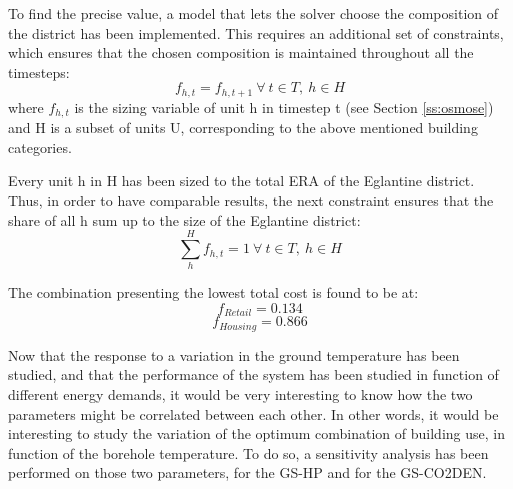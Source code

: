 \documentclass{article}
\begin{document}
To find the precise value, a model that lets the solver choose the composition of the district has been implemented. This requires an additional set of constraints, which ensures that the chosen composition is maintained throughout all the timesteps:
\begin{equation}
f_{h,t} = f_{h,t+1} \ \forall \ t \in T, \ h \in H
\end{equation}
where $f_{h,t}$ is the sizing variable of unit h in timestep t (see Section \ref{ss:osmose}) and H is a subset of units U, corresponding to the above mentioned building categories.

Every unit h in H has been sized to the total ERA of the Eglantine district. Thus, in order to have comparable results, the next constraint ensures that the share of all h sum up to the size of the Eglantine district:
\begin{equation}
\sum_{h}^{H} f_{h,t} = 1 \ \forall \ t \in T, \ h \in H
\end{equation}

The combination presenting the lowest total cost is found to be at:
$$f_{Retail} = 0.134$$
$$f_{Housing} = 0.866$$

Now that the response to a variation in the ground temperature has been studied, and that the performance of the system has been studied in function of different energy demands, it would be very interesting to know how the two parameters might be correlated between each other. In other words, it would be interesting to study the variation of the optimum combination of building use, in function of the borehole temperature. 
To do so, a sensitivity analysis has been performed on those two parameters, for the GS-HP and for the GS-CO2DEN. 

\end{document}
